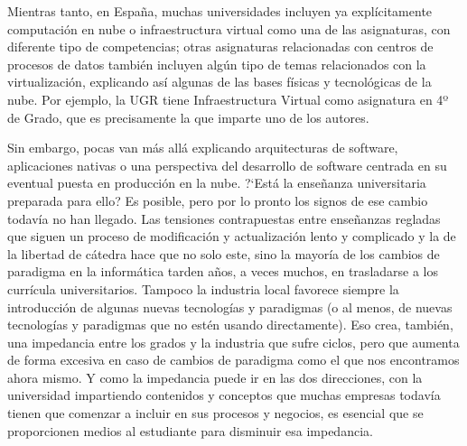 \documentclass[twoside,10pt]{article}
\begin{document}
\begin{multicols}{2}
Mientras tanto, en España, muchas universidades incluyen ya
expl\'icitamente computaci\'on en nube o infraestructura virtual como una
de las asignaturas, con diferente tipo de competencias; otras
asignaturas relacionadas con centros de procesos de datos tambi\'en
incluyen alg\'un tipo de temas relacionados con la virtualizaci\'on,
explicando as\'i algunas de las bases f\'isicas y tecnol\'ogicas de la
nube. Por ejemplo, la UGR tiene Infraestructura Virtual como
asignatura en 4º de Grado, que es precisamente la que imparte uno de
los autores. 

Sin embargo, pocas van m\'as all\'a explicando arquitecturas de software,
aplicaciones nativas o una perspectiva del desarrollo de software centrada
en su eventual puesta en producci\'on en la nube. ?`Est\'a la ense\~nanza
universitaria preparada para ello? Es posible, pero
por lo pronto los signos de ese cambio todav\'ia no han llegado. Las
tensiones contrapuestas entre ense\~nanzas regladas que siguen un proceso
de modificaci\'on y actualizaci\'on lento y complicado y la de la libertad
de c\'atedra hace que no solo este, sino la mayor\'ia de los cambios de
paradigma en la inform\'atica tarden a\~nos, a veces muchos, en trasladarse
a los curr\'icula
universitarios. 
Tampoco la industria local favorece siempre la introducción de algunas
nuevas tecnologías y paradigmas (o al menos, de nuevas tecnologías y
paradigmas que no estén usando directamente). Eso crea, tambi\'en, una
impedancia entre los grados y
la industria que sufre ciclos, pero que aumenta de forma excesiva en
caso de cambios de paradigma como el que nos encontramos ahora
mismo. Y como la impedancia puede ir en las dos direcciones, con la
universidad impartiendo contenidos y conceptos que muchas empresas
todavía tienen que comenzar a incluir en sus procesos y negocios, es
esencial que se proporcionen medios al estudiante para disminuir esa
impedancia. 


\end{multicols}
\end{document}

